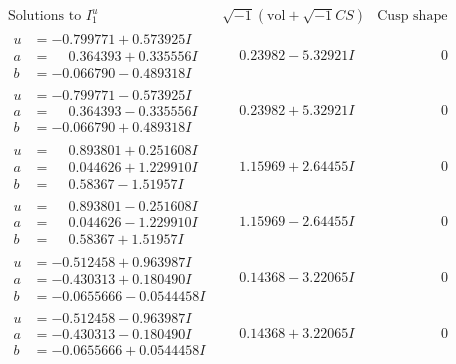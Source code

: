 \documentclass[1p]{elsarticle_modified}
\theoremstyle{definition}
\newcommand{\I}{\sqrt{-1}}
\begin{document}
$$\begin{array}{c|c|c}  
\text{Solutions to }I^u_{1}& \I (\text{vol} + \sqrt{-1}CS) & \text{Cusp shape}\\
 \hline 
\begin{aligned}
u &= -0.799771 + 0.573925 I \\
a &= \phantom{-}0.364393 + 0.335556 I \\
b &= -0.066790 - 0.489318 I\end{aligned}
 & \phantom{-}0.23982 - 5.32921 I & \phantom{-0.000000 } 0 \\ \hline\begin{aligned}
u &= -0.799771 - 0.573925 I \\
a &= \phantom{-}0.364393 - 0.335556 I \\
b &= -0.066790 + 0.489318 I\end{aligned}
 & \phantom{-}0.23982 + 5.32921 I & \phantom{-0.000000 } 0 \\ \hline\begin{aligned}
u &= \phantom{-}0.893801 + 0.251608 I \\
a &= \phantom{-}0.044626 + 1.229910 I \\
b &= \phantom{-}0.58367 - 1.51957 I\end{aligned}
 & \phantom{-}1.15969 + 2.64455 I & \phantom{-0.000000 } 0 \\ \hline\begin{aligned}
u &= \phantom{-}0.893801 - 0.251608 I \\
a &= \phantom{-}0.044626 - 1.229910 I \\
b &= \phantom{-}0.58367 + 1.51957 I\end{aligned}
 & \phantom{-}1.15969 - 2.64455 I & \phantom{-0.000000 } 0 \\ \hline\begin{aligned}
u &= -0.512458 + 0.963987 I \\
a &= -0.430313 + 0.180490 I \\
b &= -0.0655666 - 0.0544458 I\end{aligned}
 & \phantom{-}0.14368 - 3.22065 I & \phantom{-0.000000 } 0 \\ \hline\begin{aligned}
u &= -0.512458 - 0.963987 I \\
a &= -0.430313 - 0.180490 I \\
b &= -0.0655666 + 0.0544458 I\end{aligned}
 & \phantom{-}0.14368 + 3.22065 I & \phantom{-0.000000 } 0 \\ \hline\begin{aligned}

\end{aligned}
\end{array}$$
\end{document}
